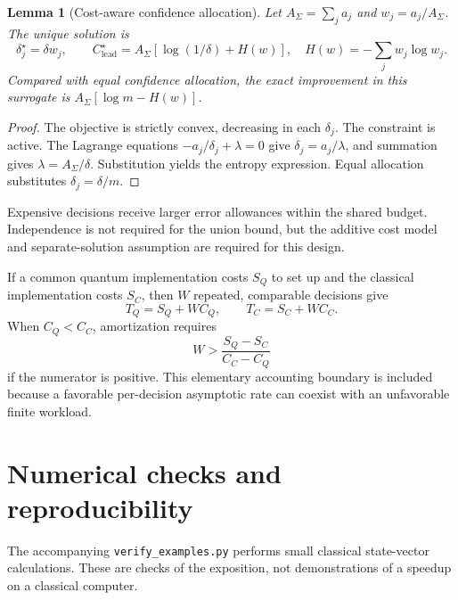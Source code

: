 \documentclass[11pt,a4paper]{article}
\newtheorem{lemma}[theorem]{Lemma}
\theoremstyle{definition}
\theoremstyle{remark}
\numberwithin{equation}{section}
\begin{document}
\begin{lemma}[Cost-aware confidence allocation]\label{prop:allocation}
Let $A_\Sigma=\sum_j a_j$ and $w_j=a_j/A_\Sigma$. The unique solution is
\begin{equation}
 \delta_j^\star=\delta w_j,\qquad
 C_{\mathrm{lead}}^\star=A_\Sigma
 \left[\log(1/\delta)+H(w)\right],
 \quad H(w)=-\sum_jw_j\log w_j.
\end{equation}
Compared with equal confidence allocation, the exact improvement in this
surrogate is $A_\Sigma[\log m-H(w)]$.
\end{lemma}
\begin{proof}
The objective is strictly convex, decreasing in each $\delta_j$.
The constraint is active. The Lagrange equations
$-a_j/\delta_j+\lambda=0$ give
$\delta_j=a_j/\lambda$, and summation gives $\lambda=A_\Sigma/\delta$.
Substitution yields the entropy expression. Equal allocation substitutes
$\delta_j=\delta/m$.
\end{proof}
Expensive decisions receive larger error allowances within the shared
budget. Independence is not required for the union bound, but the additive
cost model and separate-solution assumption are required for this design.

If a common quantum implementation costs $S_Q$ to set up and the classical
implementation costs $S_C$, then $W$ repeated, comparable decisions give
\begin{equation}
 T_Q=S_Q+WC_Q,\qquad T_C=S_C+WC_C.
\end{equation}
When $C_Q<C_C$, amortization requires
\begin{equation}
 W>\frac{S_Q-S_C}{C_C-C_Q}
\end{equation}
if the numerator is positive. This elementary accounting boundary is
included because a favorable per-decision asymptotic rate can coexist with
an unfavorable finite workload.

\section{Numerical checks and reproducibility}\label{sec:checks}
The accompanying \texttt{verify\_examples.py} performs small classical
state-vector calculations. These are checks of the exposition, not
demonstrations of a speedup on a classical computer.
\end{document}
